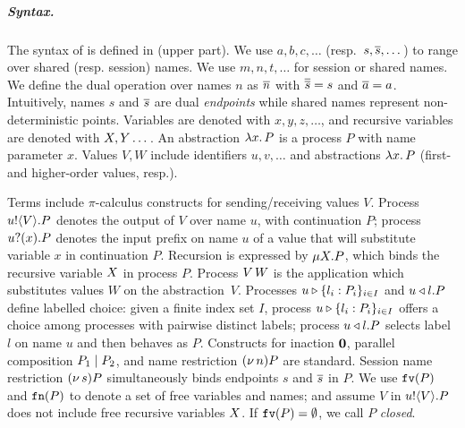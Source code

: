 \documentclass[a4paper,UKenglish]{lipics}
\theoremstyle{definition}
\begin{document}
\subparagraph{Syntax.} 
The syntax of \HOp is defined in  (upper part).
We use $a,b,c, \dots$ (resp.~$s, \overline{s}, \dots$) 
to range over shared (resp. session) names. 
We use $m, n, t, \dots$ for session or shared names. 
We define the dual operation over names $n$ as $\overline{n}$ with
$\overline{\overline{s}} = s$ and $\overline{a} = a$.
Intuitively, names $s$ and $\overline{s}$ are dual  \emph{endpoints} while 
shared names represent non-deterministic points. 
Variables are denoted with $x, y, z, \dots$, 
and recursive variables are denoted with $X, Y \dots$.
An abstraction %
$\lambda x.\,P$ is a process $P$ with name parameter $x$.
Values $V,W$ include 
identifiers $u, v, \ldots$ %
and 
abstractions $\lambda x.\,P$ (first- and higher-order values, resp.). 

{Terms} 
include $\pi$-calculus constructs for sending/receiving values $V$.
Process $u ! \langle V \rangle . P$ denotes the output of   $V$
over name $u$, with continuation $P$;
process $u ? (x) . P$ denotes the input prefix on name $u$ of a value
that 
will substitute variable $x$ in continuation $P$. 
Recursion is expressed by $\mu X. P$,
which binds the recursive variable $X$ in process $P$.
Process 
$V\, {W}$ 
is the application
which substitutes values $W$ on the abstraction~$V$. 
Processes $u \triangleright \{l_i: P_i\}_{i \in I}$  and $u \triangleleft l . P$ define labelled choice:
given a finite index set $I$, process $u \triangleright \{l_i: P_i\}_{i \in I}$ offers a choice 
among processes with pairwise distinct labels;
 process $u \triangleleft l . P$ selects label $l$ on name $u$ and then behaves as $P$.
Constructs for 
inaction $\mathbf{0}$,  parallel composition $P_1 \;|\; P_2$, and 
name restriction $(\nu\, n) P$ are standard.
Session name restriction $(\nu\, s) P$ simultaneously binds endpoints $s$ and $\overline{s}$ in $P$.
We use $\mathtt{fv}(P)$ and $\mathtt{fn}(P)$ to denote a set of free 
variables and names; 
and assume $V$ in $u ! \langle V \rangle .{P}$ does not include free recursive 
variables $X$. 
If $\mathtt{fv}(P) = \emptyset$, we call $P$ {\em closed}.
\end{document}

